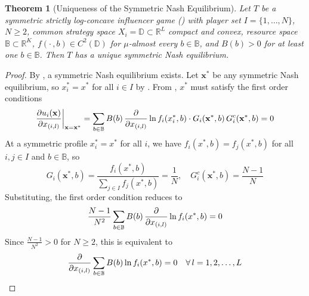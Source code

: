 \documentclass{article}
\newtheorem{theorem}{Theorem}[section]
\begin{document}
            \begin{theorem}[Uniqueness of the Symmetric Nash Equilibrium]\label{thm:SI_uniqueness}
                Let $T$ be a symmetric strictly log-concave influencer game () with player set $I = \{1,\dots,N\}$, $N\geq 2$, common strategy space $X_i = \mathbb{D} \subset \mathbb{R}^L$ compact and convex, resource space $\mathbb{B} \subset \mathbb{R}^K$, $f(\cdot\,,b)\in C^2(\mathbb{D})$ for $\mu$-almost every $b\in\mathbb{B}$, and $B(b)>0$ for at least one $b\in\mathbb{B}$. Then $T$ has a unique symmetric Nash equilibrium.
            \end{theorem}
                \begin{proof}
                    By , a symmetric Nash equilibrium exists. Let $\mathbf{x}^*$ be any symmetric Nash equilibrium, so $x_i^* = x^*$ for all $i \in I$ by . From , $x^*$ must satisfy the first order conditions
                    \begin{equation}
                        \pdv{u_i(\mathbf{x})}{x_{(i,l)}}\bigg|_{\mathbf{x}=\mathbf{x}^*} = 
                        \sum_{b\in\mathbb{B}} B(b)\, \pdv{}{x_{(i,l)}}\ln f_i(x_i^*,b) 
                        \cdot G_i(\mathbf{x}^*,b)\, G_i^c(\mathbf{x}^*,b) = 0
                    \end{equation}
                    At a symmetric profile $x_i^* = x^*$ for all $i$, we have $f_i(x^*,b) = 
                    f_j(x^*,b)$ for all $i,j \in I$ and $b \in \mathbb{B}$, so
                    \begin{equation}
                        G_i(\mathbf{x}^*,b) = \frac{f_i(x^*,b)}{\sum_{j\in I}f_j(x^*,b)} = 
                        \frac{1}{N}, \quad G_i^c(\mathbf{x}^*,b) = \frac{N-1}{N}
                    \end{equation}
                    Substituting, the first order condition reduces to
                    \begin{equation}
                        \frac{N-1}{N^2}\sum_{b\in\mathbb{B}} B(b)\, 
                        \pdv{}{x_{(i,l)}}\ln f_i(x^*,b) = 0
                    \end{equation}
                    Since $\frac{N-1}{N^2} > 0$ for $N \geq 2$, this is equivalent to
                    \begin{equation}\label{eq:SI_reduced_FOC}
                        \pdv{}{x_{(i,l)}} \sum_{b\in\mathbb{B}} B(b)\ln f_i(x^*,b) = 0 
                        \quad \forall\, l = 1,2,\dots,L

\end{equation}
\end{proof}
\end{document}
